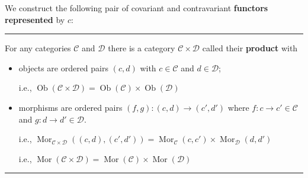 \documentclass[12pt]{article}
\newcommand{\keyword}[1]{\textbf{#1}}
\newcommand{\sepline}{\rule{\textwidth}{0.4pt}}
\theoremstyle{definition}
\newcommand{\CC}{\mathcal{C}}
\newcommand{\DD}{\mathcal{D}}
\newcommand{\<}{\left\langle}
\renewcommand{\>}{\right\rangle}
\newcommand{\Mapsto}{\longmapsto}
\DeclareMathOperator{\Ob}{Ob}
\DeclareMathOperator{\Mor}{Mor}
\renewcommand{\_}[1]{{_{#1}}}
\begin{document}
We construct the following pair of covariant and contravariant \keyword{functors represented} by $c$:
\begin{center}
    \hspace{2cm}
\end{center}



\sepline

For any categories $\CC$ and $\DD$ there is a category $\CC \times \DD$ called their \keyword{product} with
\begin{itemize}
    \item objects are ordered pairs $(c, d)$ with $c \in \CC$ and $d \in \DD$;
    
    i.e., $\Ob(\CC \times \DD) = \Ob(\CC) \times \Ob(\DD)$
    \item morphisms are ordered pairs $(f, g) : (c, d) \to (c', d')$ where $f : c \to c' \in \CC$ and $g : d \to d' \in \DD$.
    
    i.e., $\Mor_{\CC \times \DD}((c, d), (c', d')) = \Mor_{\CC}(c, c') \times \Mor_{\DD}(d, d')$

    i.e., $\Mor(\CC \times \DD) = \Mor(\CC) \times \Mor(\DD)$
\end{itemize}

\sepline
\end{document}
